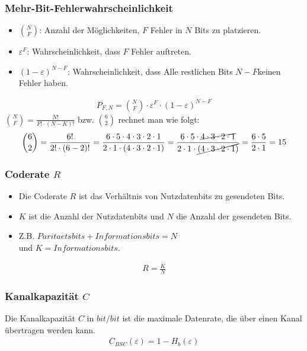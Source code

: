\subsubsection{Mehr-Bit-Fehlerwahrscheinlichkeit}
\begin{itemize}
	\item $\binom{N}{F}$: Anzahl der Möglichkeiten, $F$ Fehler in $N$ Bits zu platzieren.
	\item $\varepsilon^F$: Wahrscheinlichkeit, dass $F$ Fehler auftreten.
	\item $(1 - \varepsilon)^{N-F}$: Wahrscheinlichkeit, dass Alle restlichen Bits $N-F$keinen Fehler haben.
\end{itemize}
\begin{align*}
	P_{F,N} = \binom{N}{F} \cdot \varepsilon^F \cdot (1 - \varepsilon)^{N-F}
\end{align*}
$\binom{N}{F} = \frac{N!}{F! \cdot (N-K)!}$ bzw. $\binom{6}{2}$ rechnet man wie folgt:
\begin{align*}
	\binom{6}{2} = \frac{6!}{2! \cdot (6-2)!} = \frac{6 \cdot 5 \cdot 4 \cdot 3 \cdot 2 \cdot 1}{2 \cdot 1 \cdot (4 \cdot 3 \cdot 2 \cdot 1)}
	= \frac{6 \cdot 5 \cdot \cancel{4 \cdot 3 \cdot 2 \cdot 1}}{2 \cdot 1 \cdot \cancel{(4 \cdot 3 \cdot 2 \cdot 1)}}  = \frac{6 \cdot 5}{2 \cdot 1} = 15
\end{align*}
\subsubsection{Coderate $R$}
\begin{itemize}
	\item Die Coderate $R$ ist das Verhältnis von Nutzdatenbits zu gesendeten Bits.
	\item $K$ ist die Anzahl der Nutzdatenbits und $N$ die Anzahl der gesendeten Bits.
	\item Z.B. $Paritaetsbits + Informationsbits = N$\\ und $K = Informationsbits$.
\end{itemize}
\begin{align*}
	R = \frac{K}{N}
\end{align*}
\subsubsection{Kanalkapazität $C$}
Die Kanalkapazität $C$ in $bit/bit$ ist die maximale Datenrate, die über einen Kanal übertragen werden kann.
\begin{align*}
	C_{BSC}(\varepsilon) = 1 - H_b(\varepsilon)
\end{align*}
